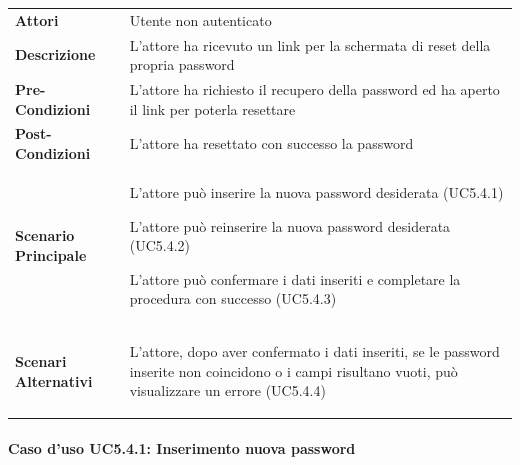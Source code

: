 \begin{minipage}{\linewidth}
	\begin{longtable}{ l | p{11cm}}
		\hline
		\rowcolor{Gray}
		\multicolumn{2}{c}{UC5.4 - Reset password} \\
		\hline
		\textbf{Attori} & Utente non autenticato \\
		\textbf{Descrizione} & L'attore ha ricevuto un link per la schermata di reset della propria password \\
		\textbf{Pre-Condizioni} & L'attore ha richiesto il recupero della password ed ha aperto il link per poterla resettare \\
		\textbf{Post-Condizioni} & L'attore ha resettato con successo la password \\
		\textbf{Scenario Principale} & 
		\begin{enumerate*}[label=(\arabic*.),itemjoin={\newline}]
			\item L'attore può inserire la nuova password desiderata (UC5.4.1)
			\item L'attore può reinserire la nuova password desiderata (UC5.4.2)
			\item L'attore può confermare i dati inseriti e completare la procedura con successo (UC5.4.3)
		\end{enumerate*}\\
		\textbf{Scenari Alternativi} & 
		\begin{enumerate*}[label=(\arabic*.),itemjoin={\newline}]
			\item L'attore, dopo aver confermato i dati inseriti, se le password inserite non coincidono o i campi risultano vuoti, può visualizzare un errore (UC5.4.4)
		\end{enumerate*}\\
	\end{longtable}
\end{minipage}

\paragraph{Caso d'uso UC5.4.1: Inserimento nuova password}
\label{UC5_4_1}

